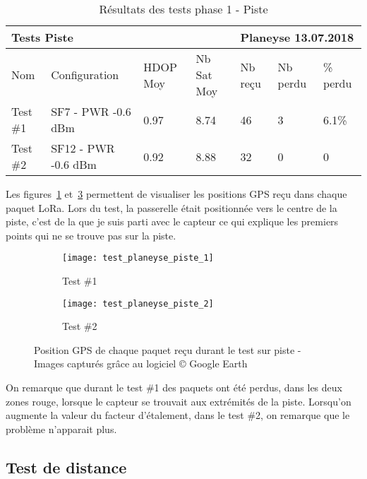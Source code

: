 \begin{table}[htb]
\caption[Résultats des tests phase 1 - Piste]{Résultats des tests phase 1 - Piste}
\label{tab:resultat_test_1_piste}
\centering
\begin{tabular}{lllllll}
\toprule
\multicolumn{4}{l}{ Tests Piste } & \multicolumn{3}{l}{ Planeyse 13.07.2018 } \\
\toprule
Nom & Configuration & HDOP Moy & Nb Sat Moy & Nb reçu & Nb perdu & \% perdu \\
\midrule
Test \#1 & SF7 - PWR -0.6 dBm & 0.97 & 8.74 & 46 & 3 & 6.1\% \\
Test \#2 & SF12 - PWR -0.6 dBm & 0.92 & 8.88 & 32 & 0 & 0  \\
\bottomrule 
\end{tabular}
\end{table}

Les figures~\ref{fig:test_piste_1} et~\ref{fig:test_piste_2} permettent de visualiser les positions GPS reçu dans chaque paquet LoRa. Lors du test, la passerelle était positionnée vers le centre de la piste, c'est de la que je suis parti avec le capteur ce qui explique les premiers points qui ne se trouve pas sur la piste.

\begin{figure}[htb]
\label{tab:resultat_tests_piste}
\centering
\begin{subfigure}[b]{1\textwidth}
   \texttt{[image: test\_planeyse\_piste\_1]}
   \caption{Test \#1}
   \label{fig:test_piste_1}
\end{subfigure}

\begin{subfigure}[b]{1\textwidth}
   \texttt{[image: test\_planeyse\_piste\_2]}
   \caption{Test \#2}
   \label{fig:test_piste_2}
\end{subfigure}
\caption[Positions GPS des tests piste]{Position GPS de chaque paquet reçu durant le test sur piste - Images capturés grâce au logiciel © Google Earth}
\end{figure}

On remarque que durant le test \#1 des paquets ont été perdus, dans les deux zones rouge, lorsque le capteur se trouvait aux extrémités de la piste. Lorsqu'on augmente la valeur du facteur d'étalement, dans le test \#2, on remarque que le problème n'apparait plus.

\subsection{Test de distance}

